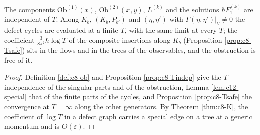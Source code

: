 \begin{proposition}[Endpoint]
\label{prop:c12-T}
The components $\mathrm{Ob}^{(1)}(x)$, $\mathrm{Ob}^{(2)}(x,y)$, $L^{(k)}$ and the solutions $\hbar F_1^{(k)}$ are independent of $T$. Along $K_b$, $(K_b,P_{b'})$ and $(\eta,\eta')$ with $\Gamma(\eta,\eta')|_V\neq0$ the defect cycles are evaluated at a finite $T$, with the same limit at every $T$; the coefficient $\tfrac3{8\pi^2}\hbar\log T$ of the composite insertions along $K_b$ (Proposition \ref{prop:c8-Tsafe}) sits in the flows and in the trees of the observables, and the obstruction is free of it.
\end{proposition}

\begin{proof}
Definition \ref{def:c8-ob} and Proposition \ref{prop:c8-Tindep} give the $T$-independence of the singular parts and of the obstruction, Lemma \ref{lem:c12-special} that of the finite parts of the cycles, and Proposition \ref{prop:c8-Tsafe} the convergence at $T=\infty$ along the other generators. By Theorem \ref{thm:c8-K}, the coefficient of $\log T$ in a defect graph carries a special edge on a tree at a generic momentum and is $O(\varepsilon)$.
\end{proof}

